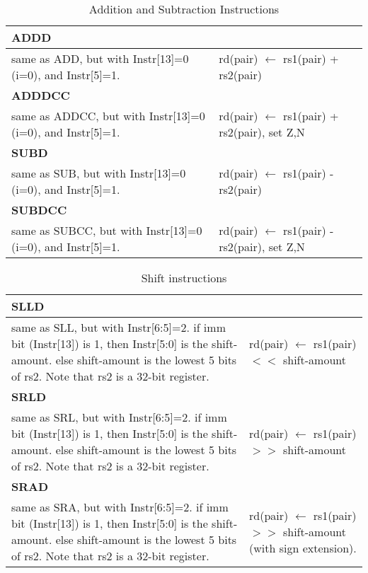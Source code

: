 \documentclass{book}
\begin{document}
\begin{table}[p]
  \centering
  \begin{tabular}[p]{|l|l|}
    \hline
\multicolumn{2}{|l|}{	\textbf{ADDD}			} \\ 
\hline
 		  same as ADD, but with Instr[13]=0 (i=0), and Instr[5]=1. & 
 		rd(pair) $\leftarrow$ rs1(pair) + rs2(pair)\\
\hline
\hline
\multicolumn{2}{|l|}{	\textbf{ADDDCC}} \\ 
\hline
 		  same as ADDCC, but with Instr[13]=0 (i=0), and Instr[5]=1. & 
 		rd(pair) $\leftarrow$ rs1(pair) + rs2(pair), set Z,N\\
\hline
\hline
\multicolumn{2}{|l|}{	\textbf{SUBD}} \\ 
\hline
 		  same as SUB, but with Instr[13]=0 (i=0), and Instr[5]=1. & 
 		rd(pair) $\leftarrow$ rs1(pair) - rs2(pair)\\
\hline
\hline
\multicolumn{2}{|l|}{	\textbf{SUBDCC}} \\ 
\hline
 		  same as SUBCC, but with Instr[13]=0 (i=0), and Instr[5]=1. & 
 		rd(pair) $\leftarrow$ rs1(pair) - rs2(pair), set Z,N\\
\hline
  \end{tabular}
  \caption{Addition and Subtraction Instructions}
  \label{tab:arith:insns}
\end{table}

\begin{table}[p]
  \centering
  \begin{tabular}[p]{|p{}|p{}|}
    \hline
\multicolumn{2}{|l|}{	\textbf{SLLD}} \\ 
 \hline 
    same as SLL, but with Instr[6:5]=2.
    if imm bit (Instr[13]) is 1, then Instr[5:0] is the shift-amount.
    else shift-amount is the lowest 5 bits of rs2. Note that rs2
    is a 32-bit register. & 
    rd(pair) $\leftarrow$  rs1(pair) $<<$ shift-amount\\
\hline
\hline
\multicolumn{2}{|l|}{	\textbf{SRLD}} \\ 
 \hline 
    same as SRL, but with Instr[6:5]=2.
    if imm bit (Instr[13]) is 1, then Instr[5:0] is the shift-amount.
    else shift-amount is the lowest 5 bits of rs2. Note that rs2
    is a 32-bit register. & 
    rd(pair) $\leftarrow$  rs1(pair) $>>$ shift-amount\\
\hline
\hline
\multicolumn{2}{|l|}{	\textbf{SRAD}} \\ 
 \hline 
    same as SRA, but with Instr[6:5]=2.
    if imm bit (Instr[13]) is 1, then Instr[5:0] is the shift-amount.
    else shift-amount is the lowest 5 bits of rs2. Note that rs2
    is a 32-bit register. & 
    rd(pair) $\leftarrow$  rs1(pair) $>>$ shift-amount (with sign extension).\\
\hline
  \end{tabular}
  \caption{Shift instructions}
  \label{tab:shift:insns}
\end{table}
\end{document}
